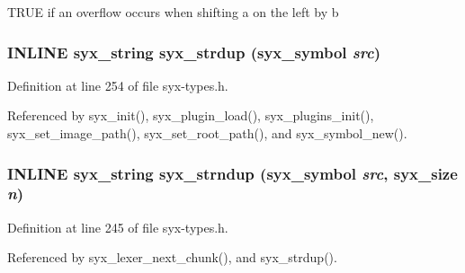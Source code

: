 TRUE if an overflow occurs when shifting a on the left by b \hypertarget{syx-types_8h_c622723fb87eeb4c68598e317e0b1ed1}{
\subsubsection{\setlength{\rightskip}{0pt plus 5cm}INLINE {\bf syx\_\-string} syx\_\-strdup ({\bf syx\_\-symbol} {\em src})}}
\label{syx-types_8h_c622723fb87eeb4c68598e317e0b1ed1}




Definition at line 254 of file syx-types.h.

Referenced by syx\_\-init(), syx\_\-plugin\_\-load(), syx\_\-plugins\_\-init(), syx\_\-set\_\-image\_\-path(), syx\_\-set\_\-root\_\-path(), and syx\_\-symbol\_\-new().\hypertarget{syx-types_8h_d155efe16b514198d225ce33322cca13}{
\subsubsection{\setlength{\rightskip}{0pt plus 5cm}INLINE {\bf syx\_\-string} syx\_\-strndup ({\bf syx\_\-symbol} {\em src}, \/  {\bf syx\_\-size} {\em n})}}
\label{syx-types_8h_d155efe16b514198d225ce33322cca13}




Definition at line 245 of file syx-types.h.

Referenced by syx\_\-lexer\_\-next\_\-chunk(), and syx\_\-strdup().